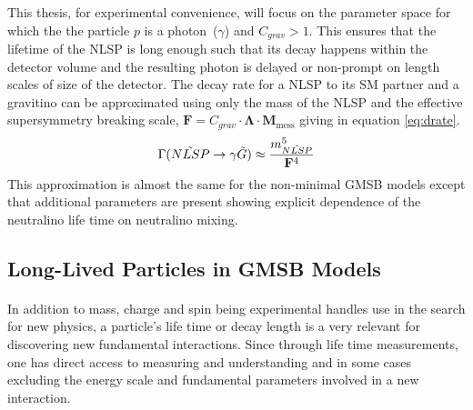 {This thesis, for experimental convenience, will focus on the parameter space for which the the particle $p$ is a photon~($\gamma$) and $C_{grav} > 1$.
This ensures that the lifetime of the NLSP is long enough such that its decay happens within the detector volume and the resulting photon is delayed or non-prompt on length scales of size of the detector.
The decay rate for a NLSP to its SM partner and a gravitino can be approximated using only the mass of the
NLSP and the effective supersymmetry breaking scale, $\mathbf{F} = C_{grav}\cdot \mathbf{\Lambda}\cdot\mathbf{M}_{\mbox{mess}}$
giving in equation \ref{eq:drate}.
\begin{equation}{\label{eq:drate}}
\Gamma(\tilde{NLSP} \rightarrow \gamma\tilde{G}) \approx  \frac{m^{5}_{\tilde{NLSP}}}{\mathbf{F}^{4}}
\end{equation}
This approximation is almost the same for the non-minimal GMSB models except that additional parameters are present showing explicit dependence of the neutralino life time on neutralino mixing.
\subsection{Long-Lived Particles in GMSB Models}
\paragraph*{}
In addition to mass, charge and spin being experimental handles use in the search for new physics, a particle's life time or decay length is a very relevant for discovering new fundamental interactions. Since through life time measurements, one has direct access to measuring and understanding and in some cases excluding the energy scale and fundamental parameters involved in a new interaction.
}
